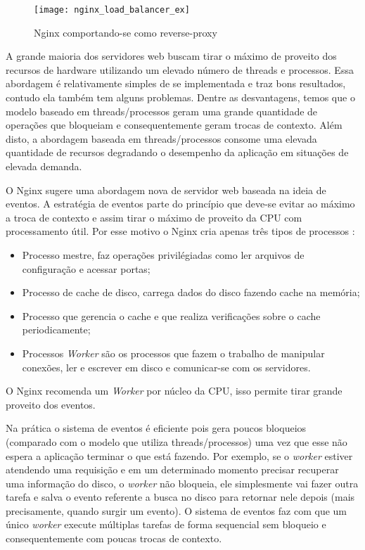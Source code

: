 \begin{figure}[!h]
  \centering
  \texttt{[image: nginx\_load\_balancer\_ex]} 
  \caption{Nginx comportando-se como reverse-proxy \citep{soni}}
  \label{fig:nginx_basico} 
\end{figure}

A grande maioria dos servidores web buscam tirar o máximo de proveito dos recursos
de hardware utilizando um elevado número de threads e processos. Essa abordagem
é relativamente simples de se implementada e traz bons resultados, contudo ela
também tem alguns problemas. Dentre as desvantagens, temos que o modelo baseado
em threads/processos geram uma grande quantidade de operações que bloqueiam e
consequentemente geram trocas de contexto. Além disto, a abordagem baseada em
threads/processos consome uma elevada quantidade de recursos degradando o
desempenho da aplicação em situações de elevada demanda.

O Nginx sugere uma abordagem nova de servidor web baseada na ideia de eventos.
A estratégia de eventos parte do princípio que deve-se evitar ao máximo a troca
de contexto e assim tirar o máximo de proveito da CPU com processamento útil.
Por esse motivo o Nginx cria apenas três tipos de processos
\citep{nginx_architecture}:

\begin{itemize}
  \item Processo mestre, faz operações privilégiadas como ler arquivos de configuração e acessar portas;
  \item Processo de cache de disco, carrega dados do disco fazendo cache na memória;
  \item Processo que gerencia o cache e que realiza verificações sobre o cache periodicamente;
  \item Processos \textit{Worker} são os processos que fazem o trabalho de manipular conexões, ler e escrever em disco e comunicar-se com os servidores.
\end{itemize}

O Nginx recomenda um \textit{Worker} por núcleo da CPU, isso permite tirar
grande proveito dos eventos.

Na prática o sistema de eventos é eficiente pois gera poucos bloqueios
(comparado com o modelo que utiliza threads/processos) uma vez que esse não
espera a aplicação terminar o que está fazendo. Por exemplo, se o
\textit{worker} estiver atendendo uma requisição e em um determinado momento
precisar recuperar uma informação do disco, o \textit{worker} não bloqueia, ele
simplesmente vai fazer outra tarefa e salva o evento referente a busca no disco
para retornar nele depois (mais precisamente, quando surgir um evento). O
sistema de eventos faz com que um único \textit{worker} execute múltiplas
tarefas de forma sequencial sem bloqueio e consequentemente com poucas trocas
de contexto.

